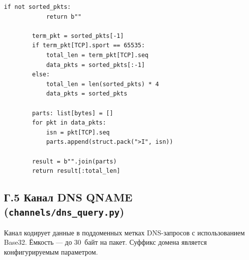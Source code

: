 \begin{lstlisting}[style=appendixcode]
        if not sorted_pkts:
            return b""

        term_pkt = sorted_pkts[-1]
        if term_pkt[TCP].sport == 65535:
            total_len = term_pkt[TCP].seq
            data_pkts = sorted_pkts[:-1]
        else:
            total_len = len(sorted_pkts) * 4
            data_pkts = sorted_pkts

        parts: list[bytes] = []
        for pkt in data_pkts:
            isn = pkt[TCP].seq
            parts.append(struct.pack(">I", isn))

        result = b"".join(parts)
        return result[:total_len]
\end{lstlisting}

\newpage
\subsection*{Г.5 Канал DNS QNAME (\texttt{channels/dns\_query.py})}

Канал кодирует данные в поддоменных метках DNS-запросов с использованием
Base32. Ёмкость --- до 30~байт на пакет. Суффикс домена является
конфигурируемым параметром.

